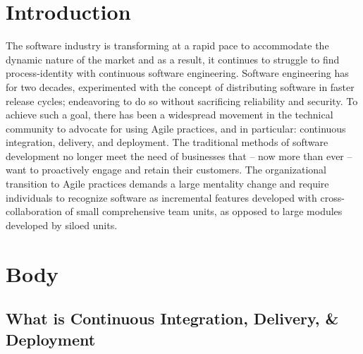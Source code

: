 \documentclass[11pt,a4paper]{article}
\begin{document}

\tableofcontents
\newpage

\section{Introduction}
The software industry is transforming at a rapid pace to accommodate the dynamic nature of the market and as a result, it continues to struggle to find process-identity with continuous software engineering. Software engineering has for two decades, experimented with the concept of distributing software in faster release cycles; endeavoring to do so without sacrificing reliability and security. To achieve such a goal, there has been a widespread movement in the technical community to advocate for using Agile practices, and in particular: continuous integration, delivery, and deployment. The traditional methods of software development no longer meet the need of businesses that -- now more than ever -- want to proactively engage and retain their customers. The organizational transition to Agile practices demands a large mentality change and require individuals to recognize software as incremental features developed with cross-collaboration of small comprehensive team units, as opposed to large modules developed by siloed units.

\section{Body}
	\subsection{What is Continuous Integration, Delivery, \& Deployment}
\end{document}
